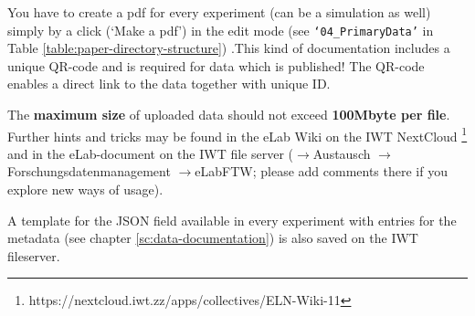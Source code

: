 You have to create a pdf for every experiment (can be a simulation as well) simply by a click (`Make a pdf’) in the edit mode (see \texttt{‘04\_PrimaryData’} in Table   \ref{table:paper-directory-structure}) .This kind of documentation includes a unique QR-code and is required for data which is published! The QR-code enables a direct link to the data together with unique ID.

The \textbf{maximum size} of uploaded data should not exceed
\textbf{100Mbyte per file}. Further hints and tricks may be found in the eLab Wiki on the IWT NextCloud \footnote{https://nextcloud.iwt.zz/apps/collectives/ELN-Wiki-11} and in the eLab-document on the IWT file server ($\rightarrow$Austausch $\rightarrow$Forschungsdatenmanagement $\rightarrow$eLabFTW; please add comments there if you explore new ways of usage).


A template for the JSON field available in every experiment with entries for the metadata (see chapter \ref{sc:data-documentation}) is also saved on the IWT fileserver.

